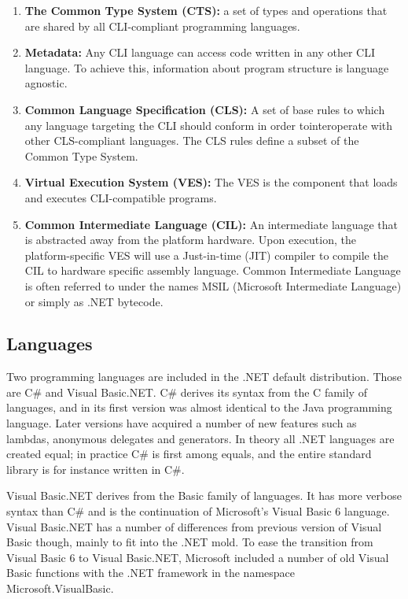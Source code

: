 	\begin{enumerate}
		
		\item \textbf{The Common Type System (CTS):} a set of types and operations 
		that are shared by all CLI-compliant programming languages.
		
		\item \textbf{Metadata:} Any CLI language can access code written in any 
		other CLI language. To achieve this, information about program structure 
		is language agnostic.
	
		\item \textbf{Common Language Specification (CLS):} A set of base rules to 
		which any language targeting the CLI should conform in order 
		tointeroperate with other CLS-compliant languages. The CLS rules define a 
		subset of the Common Type System.
	
		\item \textbf{Virtual Execution System (VES):} The VES is the component 
		that loads and executes CLI-compatible programs. 
	
		\item \textbf{Common Intermediate Language (CIL):} An intermediate 
		language that is abstracted away from the platform hardware. Upon 
		execution, the platform-specific VES will use a Just-in-time (JIT) 
		compiler to compile the CIL to hardware specific assembly language. Common 
		Intermediate Language is often referred to under the names MSIL (Microsoft 
		Intermediate Language) or simply as .NET bytecode.

	\end{enumerate}
    
\subsection{Languages}
	
	Two programming languages are included in the .NET default distribution. 
	Those are C\# and Visual Basic.NET. C\# derives its syntax from the C family 
	of languages, and in its first version was almost identical to the Java 
	programming language. Later versions have acquired a number of new features 
	such as lambdas, anonymous delegates and generators. In theory all .NET 
	languages are created equal; in practice C\# is first among equals, and the 
	entire standard library is for instance written in C\#. 

	Visual Basic.NET derives from the Basic family of languages. It has more 
	verbose syntax than C\# and is the continuation of Microsoft's Visual Basic 
	6 language. Visual Basic.NET has a number of differences from previous 
	version of Visual Basic though, mainly to fit into the .NET mold. To ease 
	the transition from Visual Basic 6 to Visual Basic.NET, Microsoft included a 
	number of old Visual Basic functions with the .NET framework in the 
	namespace Microsoft.VisualBasic. 
	
